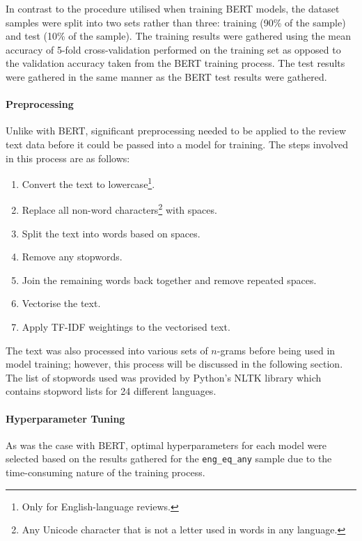 In contrast to the procedure utilised when training BERT models, the dataset samples were split into two sets rather than three: training (90\% of the sample) and test (10\% of the sample). The training results were gathered using the mean accuracy of 5-fold cross-validation performed on the training set as opposed to the validation accuracy taken from the BERT training process. The test results were gathered in the same manner as the BERT test results were gathered.

\paragraph{Preprocessing}

Unlike with BERT, significant preprocessing needed to be applied to the review text data before it could be passed into a model for training. The steps involved in this process are as follows:

\begin{enumerate}
    \item Convert the text to lowercase\footnote{Only for English-language reviews.}.
    \item Replace all non-word characters\footnote{Any Unicode character that is not a letter used in words in any language.} with spaces.
    \item Split the text into words based on spaces.
    \item Remove any stopwords.
    \item Join the remaining words back together and remove repeated spaces.
    \item Vectorise the text.
    \item Apply TF-IDF weightings to the vectorised text.
\end{enumerate}

The text was also processed into various sets of $n$-grams before being used in model training; however, this process will be discussed in the following section. The list of stopwords used was provided by Python's NLTK library \cite{bird2009natural} which contains stopword lists for 24 different languages.

\paragraph{Hyperparameter Tuning}

As was the case with BERT, optimal hyperparameters for each model were selected based on the results gathered for the \texttt{eng\_eq\_any} sample due to the time-consuming nature of the training process.

